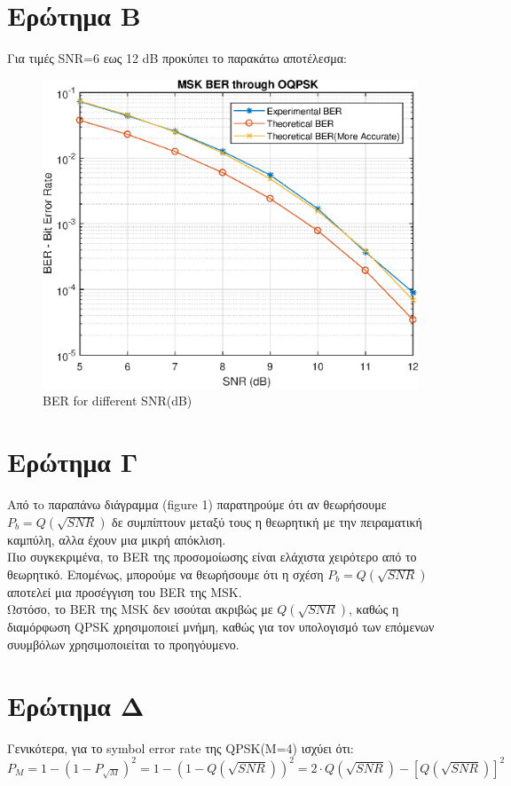 \documentclass{article}
\begin{document}
\section{Eρώτημα Β}
Για τιμές SNR=6 εως 12 dB προκύπει το παρακάτω αποτέλεσμα:\\
\begin{figure}[h]
	\centering
	\includegraphics[width=0.8\linewidth]{./results/epsFig}
	\caption{BER for different SNR(dB)}
\end{figure}
\section{Eρώτημα Γ}
Από τo παραπάνω διάγραμμα (figure 1) παρατηρούμε ότι αν θεωρήσουμε $P_{b} = Q(\sqrt{SNR})$ δε συμπίπτουν μεταξύ τους η θεωρητική με την πειραματική καμπύλη, αλλα έχουν μια μικρή απόκλιση. \\
Πιο συγκεκριμένα, το BER της προσομοίωσης είναι ελάχιστα χειρότερο από το θεωρητικό. Eπομένως, μπορούμε να θεωρήσουμε ότι η σχέση $P_{b} = Q(\sqrt{SNR})$ αποτελεί μια προσέγγιση του BER της MSK.\\
Ωστόσο, το BER της MSK δεν ισούται ακριβώς με $Q(\sqrt{SNR})$, καθώς η διαμόρφωση QPSK χρησιμοποιεί μνήμη, καθώς για τον υπολογισμό των επόμενων συυμβόλων χρησιμοποιείται το προηγόυμενο.
\section{Eρώτημα Δ}
Γενικότερα, για το symbol error rate της QPSK(M=4) ισχύει ότι:\\
$$P_{M}= 1 - (1 - P_{\sqrt{M}} )^2 = 
1 - (1 - Q(\sqrt{SNR}) )^2 = 
2 \cdot  Q(\sqrt{SNR}) - [Q(\sqrt{SNR})]^2$$ \\
\end{document}

